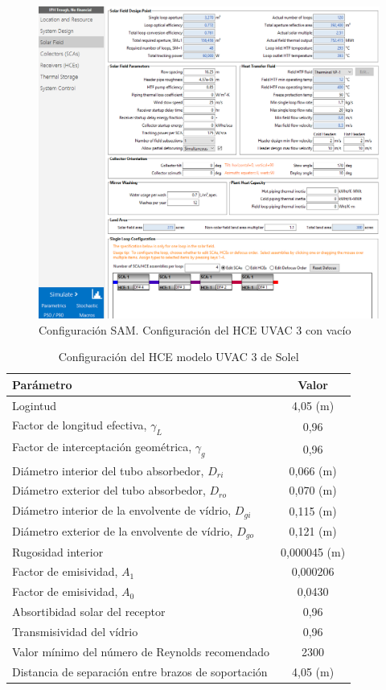 \begin{figure}[H]
\includegraphics[width=0.9\linewidth]{images/captura_sam_iph03.png}
\caption{Configuración SAM. Configuración del HCE UVAC 3 con vacío}
\label{fig:captura04}
\end{figure}


\begin{table}[H]
\centering
\caption{Configuración del HCE modelo UVAC 3 de Solel}
\label{tab:configuracionHCE}
\begin{tabular}{lc}
Parámetro & Valor \\ \hline
Logintud & 4,05 (m) \\
Factor de longitud efectiva, \(\gamma_L\) &  0,96 \\
Factor de interceptación geométrica, \(\gamma_g\) & 0,96 \\
Diámetro interior del tubo absorbedor, \(D_{ri}\) & 0,066 (m) \\
Diámetro exterior del tubo absorbedor, \(D_{ro}\) &  0,070 (m) \\ 
Diámetro interior de la envolvente de vídrio, \(D_{gi}\) &  0,115 (m) \\
Diámetro exterior de la envolvente de vídrio, \(D_{go}\) &  0,121 (m) \\
Rugosidad interior &  0,000045 (m)  \\
Factor de emisividad, \(A_1\) &  0,000206 \\
Factor de emisividad, \(A_0\) &  0,0430 \\
Absortibidad solar del receptor &  0,96 \\
Transmisividad del vídrio &  0,96 \\
Valor mínimo del número de Reynolds recomendado &  2300 \\
Distancia de separación entre brazos de soportación &  4,05 (m) 
\end{tabular}
\end{table}


